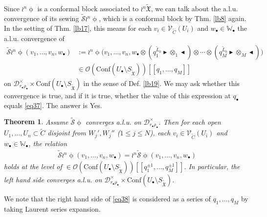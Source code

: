\documentclass[12pt,a4paper,notitlepage]{article}
\theoremstyle{definition}
\theoremstyle{plain}
\newtheorem{thm}[df]{Theorem}
\newcommand{\fk}{\mathfrak}
\newcommand{\mc}{\mathcal}
\newcommand{\wtd}{\widetilde}
\newcommand{\Conf}{\mathrm{Conf}}
\newcommand{\scr}{\mathscr}
\newcommand{\blt}{\bullet}
\newcommand{\Wbb}{\mathbb W}
\newcommand{\btl}{\blacktriangleleft}
\newcommand{\btr}{\blacktriangleright}
\newcommand{\SXtd}{S_{\wtd{\fk X}}}
\numberwithin{equation}{section}
\begin{document}
Since $\wr^n\upphi$ is a conformal block associated to $\wr^n\wtd{\fk X}$, we can talk about the a.l.u. convergence of its sewing $\wtd{\mc S}\wr^n\upphi$, which is a conformal block by Thm. \ref{lb8} again. In the setting of Thm. \ref{lb17}, this means  for each $v_i\in\scr V_{\wtd C}(U_i)$ and $w_\blt\in\Wbb_\blt$ the a.l.u. convergence of
\begin{align}
\wtd{\mc S}\wr^n\upphi(v_1,\dots,v_n,w_\blt)&:=\wr^n\upphi\Big(v_1,\dots,v_n,w_\blt\otimes(q_1^{\wtd  L_0}\btr\otimes_1\btl)\otimes\cdots\otimes (q_M^{\wtd  L_0}\btr\otimes_M\btl)\Big)	\label{eq39}\\
&\in\scr O(\Conf(U_\blt\setminus\SXtd))[[q_1,\dots,q_M]]\nonumber
\end{align}
on $\mc D_{r_\blt\rho_\blt}^\times\times \Conf(U_\blt\setminus\SXtd)$ in the sense of Def. \ref{lb19}. We may ask whether this convergence is true, and if it is true, whether the value of this expression at $q_\blt$ equals \eqref{eq37}. The answer is Yes.

\begin{thm}\label{lb21}
Assume $\wtd{\mc S}\upphi$ converges a.l.u. on $\mc D_{r_\blt\rho_\blt}^\times$. Then for each open $U_1,\dots,U_n\subset \wtd C$ disjoint from $W_j',W_j''$ ($1\leq j\leq N$), each $v_i\in\scr V_{\wtd C}(U_i)$ and $w_\blt\in\Wbb_\blt$, the relation
\begin{align}
\wtd{\mc S}\wr^n\upphi(v_1,\dots,v_n,w_\blt)=	\wr^n\wtd{\mc S}\upphi(v_1,\dots,v_n,w_\blt)\label{eq38}
\end{align}
holds at the level of $\in\scr O(\Conf(U_\blt\setminus\SXtd))[[q_1^{\pm 1},\dots,q_M^{\pm 1}]]$. In particular, the left hand side converges a.l.u. on $\mc D_{r_\blt\rho_\blt}^\times\times\Conf(U_\blt\setminus\SXtd)$.
\end{thm}
We note that the right hand side of \eqref{eq38} is considered as a series of $q_1,\dots,q_M$ by taking Laurent series expansion.
\end{document}
